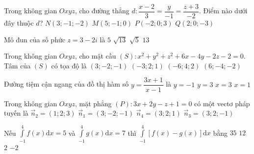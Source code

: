 \begin{ex}%
	Trong không gian $Oxyz$, cho đường thẳng $d\colon \dfrac{x-2}{3}=\dfrac{y}{-1}=\dfrac{z+3}{-2}$. Điểm nào dưới đây thuộc $d$?	
	\choice
	{$N(3;-1;-2)$}
	{$M(5;-1;0)$}
	{$P(-2;0;3)$}
	{\True $Q(2;0;-3)$}
\end{ex}
\begin{ex}%
	Mô đun của số phức $z=3-2 i$ là	
	\choice
	{$5$}
	{\True $\sqrt{13}$}
	{$\sqrt{5}$}
	{$13$}
\end{ex}
\begin{ex}%
	Trong không gian $O x y z$, cho mặt cầu $(S)\colon x^2+y^2+z^2+6 x-4 y-2 z-2=0$. Tâm của $(S)$ có tọa độ là	
	\choice
	{$(3;-2;-1)$}
	{\True $(-3;2;1)$}
	{$(-6;4;2)$}
	{$(6;-4;-2)$}
\end{ex}
\begin{ex}%
	Đường tiệm cận ngang của đồ thị hàm số $y=\dfrac{3 x+1}{x-1}$ là	
	\choice
	{$y=-1$}
	{\True $y=3$}
	{$x=3$}
	{$x=1$}
\end{ex}
\begin{ex}%
	Trong không gian $O x y z$, mặt phẳng $(P)\colon 3 x+2 y-z+1=0$ có một vectơ pháp tuyến là
	\choice
	{$\overrightarrow{n}_2=(1 ; 2 ; 3)$}
	{$\overrightarrow{n}_1=(3;-2;-1)$}
	{$\overrightarrow{n}_4=(3;2;1)$}
	{\True $\overrightarrow{n}_3=(3;2;-1)$}
\end{ex}
\begin{ex}%
	Nếu $\displaystyle\int\limits_{-1}^4 f(x) \mathrm{d} x=5$ và $\displaystyle\int\limits_{-1}^4 g(x) \mathrm{d} x=7$ thì $\displaystyle\int\limits_{-1}^4[f(x)-g(x)] \mathrm{d} x$ bằng	
	\choice
	{$35$}
	{$12$}
	{$2$}
	{\True $-2$}
\end{ex}
